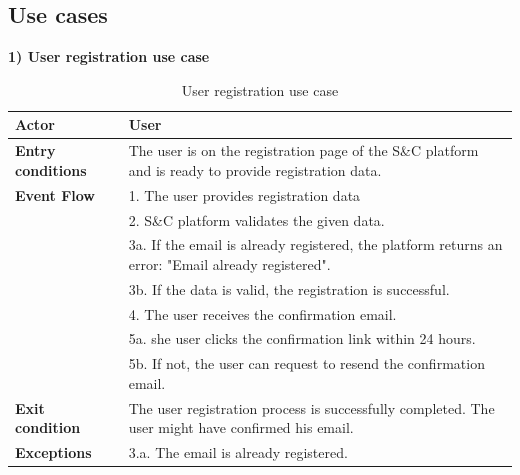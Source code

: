\subsection{Use cases}
\textbf{1) User registration use case}\\
\begin{table}[h!]
    \centering
    \begin{tabular}{lp{10cm}}
        \textbf{Actor} & User \\ \hline
        \textbf{Entry conditions} & The user is on the registration page of the S\&C platform and is ready to provide registration data. \\ \hline
        \textbf{Event Flow} &
        1. The user provides registration data \\
        & 2. S\&C platform validates the given data. \\
        & 3a. If the email is already registered, the platform returns an error: "Email already registered". \\
        & 3b. If the data is valid, the registration is successful. \\
        & 4. The user receives the confirmation email. \\
        & 5a. she user clicks the confirmation link within 24 hours. \\
        & 5b. If not, the user can request to resend the confirmation email. \\
        \hline
        \textbf{Exit condition} & The user registration process is successfully completed. The user might have confirmed his email. \\ \hline
        \textbf{Exceptions} &
        3.a. The email is already registered. \\
    \end{tabular}
    \caption{User registration use case}
    \label{tab:user_registration}
\end{table}

